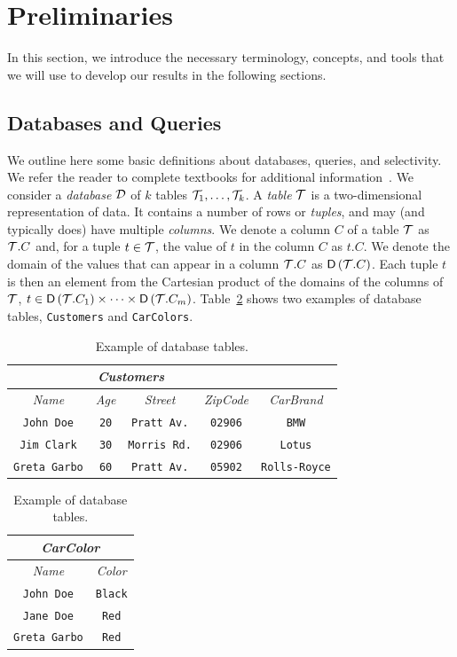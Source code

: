 \section{Preliminaries}\label{sec:prelims}
In this section, we introduce the necessary terminology, concepts, and tools
that we will use to develop our results in the following sections.

\subsection{Databases and Queries}\label{sec:dbqueries}
We outline here some basic definitions about databases, queries, and
selectivity. We refer the reader to complete textbooks for additional
information~\citep{GarciaMolinaUW02}.
We consider a \emph{database} ${\cal D}$ of $k$ tables ${\cal T}_1,\dotsc,{\cal T}_k$. 
A \emph{table} ${\cal T}$ is a two-dimensional representation of data. It
contains a number of rows or \emph{tuples}, and may (and typically does) have multiple
\emph{columns}. We denote a column $C$ of a table ${\cal T}$ as ${\cal T}.C$ and, for a
tuple $t\in{\cal T}$, the value of $t$ in the column $C$ as $t.C$. We denote the
domain of the values that can appear in a column ${\cal T}.C$ as $\mathsf{D}\left({\cal T}.C\right)$.
Each tuple $t$ is then an element from the Cartesian product of the domains of
the columns of ${\cal T}$, $t\in \mathsf{D}\left({\cal T}.C_1\right)\times\dotsb\times
\mathsf{D}\left({\cal T}.C_m\right)$. Table~\ref{tab:example} shows two examples of database
tables, \texttt{Customers} and \texttt{CarColors}. 

\begin{table}[htb]
  \centering
  \begin{tabular}{c|c|c|c|c}
    \multicolumn{4}{c}{\emph{Customers}} \\
    \midrule
    \emph{Name} & \emph{Age} & \emph{Street} & \emph{ZipCode} & \emph{CarBrand} \\
    \midrule
    \texttt{John Doe} & \texttt{20} & \texttt{Pratt Av.} & \texttt{02906} & \texttt{BMW} \\
    \texttt{Jim Clark} &  \texttt{30} &\texttt{Morris Rd.} & \texttt{02906} & \texttt{Lotus} \\
    \texttt{Greta Garbo} & \texttt{60} & \texttt{Pratt Av.} & \texttt{05902} & \texttt{Rolls-Royce} \\
    \bottomrule
  \end{tabular}
  \hfill
  \begin{tabular}{c|c}
    \multicolumn{2}{c}{\emph{CarColor}} \\
    \midrule
    \emph{Name} & \emph{Color} \\
    \midrule
    \texttt{John Doe} & \texttt{Black} \\
    \texttt{Jane Doe} & \texttt{Red} \\
    \texttt{Greta Garbo} & \texttt{Red}\\ 
    \bottomrule
  \end{tabular}
  \caption{Example of database tables.}
  \label{tab:example}
\end{table}

